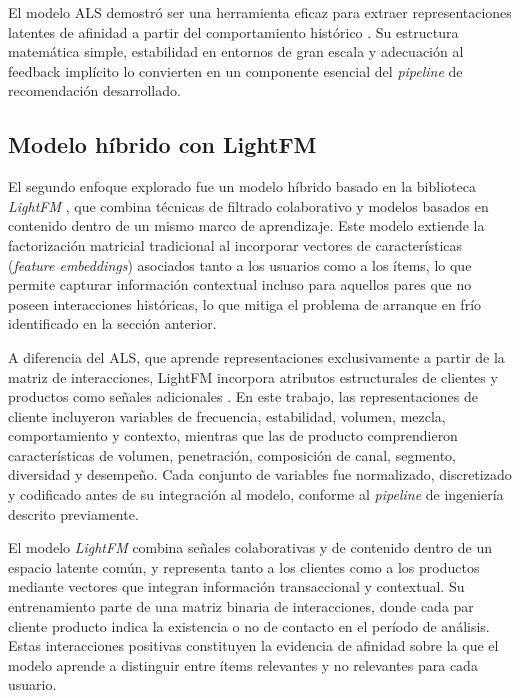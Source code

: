 El modelo ALS demostró ser una herramienta eficaz para extraer representaciones latentes de afinidad a partir del comportamiento histórico \cite{ARTICLE:Koren2009}. Su estructura matemática simple, estabilidad en entornos de gran escala y adecuación al feedback implícito lo convierten en un componente esencial del \textit{pipeline} de recomendación desarrollado.

\subsection{Modelo híbrido con LightFM}

El segundo enfoque explorado fue un modelo híbrido basado en la biblioteca \textit{LightFM} \cite{ARTICLE:LightFM2015}, que combina técnicas de filtrado colaborativo y modelos basados en contenido dentro de un mismo marco de aprendizaje. Este modelo extiende la factorización matricial tradicional al incorporar vectores de características (\textit{feature embeddings}) asociados tanto a los usuarios como a los ítems, lo que permite capturar información contextual incluso para aquellos pares que no poseen interacciones históricas, lo que mitiga el problema de arranque en frío identificado en la sección anterior.

A diferencia del ALS, que aprende representaciones exclusivamente a partir de la matriz de interacciones, LightFM incorpora atributos estructurales de clientes y productos como señales adicionales \cite{ARTICLE:LightFM2015}. En este trabajo, las representaciones de cliente incluyeron variables de frecuencia, estabilidad, volumen, mezcla, comportamiento y contexto, mientras que las de producto comprendieron características de volumen, penetración, composición de canal, segmento, diversidad y desempeño. Cada conjunto de variables fue normalizado, discretizado y codificado antes de su integración al modelo, conforme al \textit{pipeline} de ingeniería descrito previamente.

El modelo \textit{LightFM} combina señales colaborativas y de contenido dentro de un espacio latente común, y representa tanto a los clientes como a los productos mediante vectores que integran información transaccional y contextual. Su entrenamiento parte de una matriz binaria de interacciones, donde cada par cliente producto indica la existencia o no de contacto en el período de análisis. Estas interacciones positivas constituyen la evidencia de afinidad sobre la que el modelo aprende a distinguir entre ítems relevantes y no relevantes para cada usuario.

